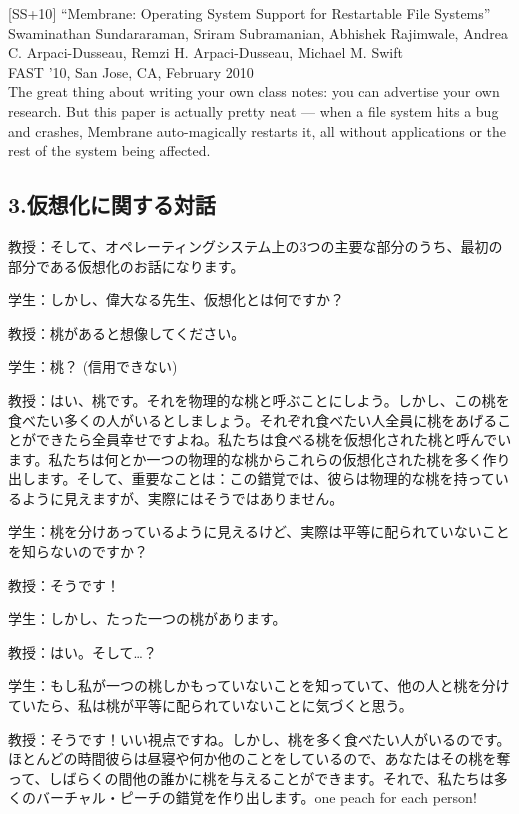{[}SS+10{]} ``Membrane: Operating System Support for Restartable File
Systems''\\
Swaminathan Sundararaman, Sriram Subramanian, Abhishek Rajimwale, Andrea
C. Arpaci-Dusseau, Remzi H. Arpaci-Dusseau, Michael M. Swift\\
FAST '10, San Jose, CA, February 2010\\
The great thing about writing your own class notes: you can advertise
your own research. But this paper is actually pretty neat --- when a
file system hits a bug and crashes, Membrane auto-magically restarts it,
all without applications or the rest of the system being affected.

\newpage

\hypertarget{ux4eeeux60f3ux5316ux306bux95a2ux3059ux308bux5bfeux8a71}{%
\subsection*{3.仮想化に関する対話}\label{ux4eeeux60f3ux5316ux306bux95a2ux3059ux308bux5bfeux8a71}}

教授：そして、オペレーティングシステム上の3つの主要な部分のうち、最初の部分である仮想化のお話になります。

学生：しかし、偉大なる先生、仮想化とは何ですか？

教授：桃があると想像してください。

学生：桃？ (信用できない)

教授：はい、桃です。それを物理的な桃と呼ぶことにしよう。しかし、この桃を食べたい多くの人がいるとしましょう。それぞれ食べたい人全員に桃をあげることができたら全員幸せですよね。私たちは食べる桃を仮想化された桃と呼んでいます。私たちは何とか一つの物理的な桃からこれらの仮想化された桃を多く作り出します。そして、重要なことは：この錯覚では、彼らは物理的な桃を持っているように見えますが、実際にはそうではありません。

学生：桃を分けあっているように見えるけど、実際は平等に配られていないことを知らないのですか？

教授：そうです！

学生：しかし、たった一つの桃があります。

教授：はい。そして\ldots？

学生：もし私が一つの桃しかもっていないことを知っていて、他の人と桃を分けていたら、私は桃が平等に配られていないことに気づくと思う。

教授：そうです！いい視点ですね。しかし、桃を多く食べたい人がいるのです。ほとんどの時間彼らは昼寝や何か他のことをしているので、あなたはその桃を奪って、しばらくの間他の誰かに桃を与えることができます。それで、私たちは多くのバーチャル・ピーチの錯覚を作り出します。one
peach for each person!

